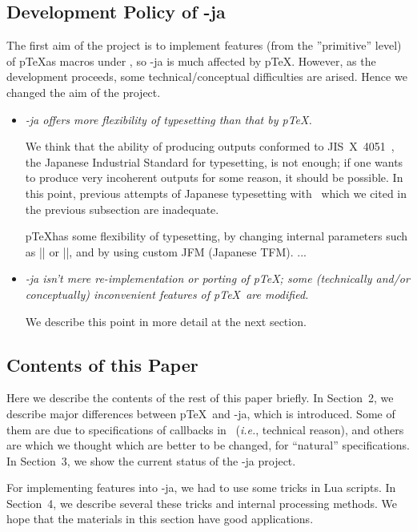 \documentclass{ajt}
\begin{document}
\subsection{Development Policy of \LuaTeX-ja}
\label{ssec-pol} 
The first aim of the project is to implement features (from the
''primitive'' level) of p\TeX as macros under \LuaTeX, so \LuaTeX-ja is
much affected by p\TeX.  However, as the development proceeds, some
technical/conceptual difficulties are arised. Hence we changed the aim
of the project.
\begin{itemize}
\item\emph{\LuaTeX-ja offers more flexibility of typesetting than that by
     p\TeX.}

     We think that the ability of producing outputs conformed to
     JIS~X~4051~\cite{jisx4051}, the Japanese Industrial Standard for
     typesetting, is not enough; if one wants to produce very
     incoherent outputs for some reason, it should be possible. 
In this point, previous attempts of Japanese typesetting with \LuaTeX\
     which we cited in the previous subsection are inadequate.

p\TeX has some flexibility of typesetting, by changing internal
     parameters such as |\kanjiskip| or |\prebreakpenalty|, and by using
     custom JFM (Japanese TFM). ...

\item\emph{\LuaTeX-ja isn't mere re-implementation or porting of p\TeX;
     some (technically and/or conceptually) inconvenient features of
     p\TeX\ are modified.} 

     We describe this point in more detail at the next section.
\end{itemize}


\subsection{Contents of this Paper}
Here we describe the contents of the rest of this paper briefly. 
In Section~2, we describe major differences between p\TeX\ and \LuaTeX-ja,
which is introduced. Some of them are due to specifications of callbacks
in \LuaTeX\ (\emph{i.e.}, technical reason), and others are which we
thought which are better to be changed, for ``natural''
specifications. In Section~3, we show the current status of the \LuaTeX-ja project.

For implementing features into \LuaTeX-ja, we had to use some tricks in Lua scripts. 
In Section~4, we describe several these tricks and internal processing methods.
We hope that the materials in this section have good applications.
\end{document}
